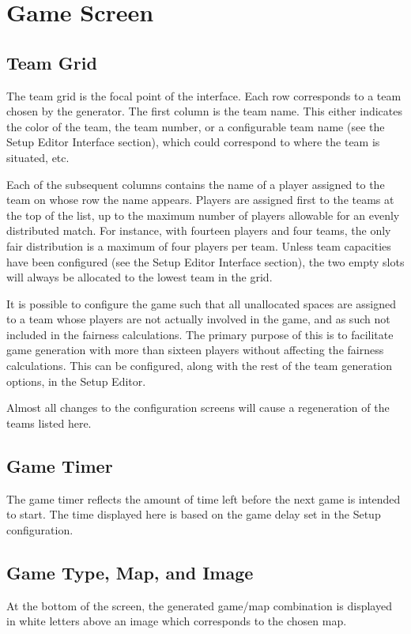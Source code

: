 \documentclass[10pt,a4paper]{report}
\begin{document}
\section{Game Screen}
\subsection{Team Grid}
The team grid is the focal point of the interface.  Each row corresponds to a team chosen by the generator.  The first column is the team name.  This either indicates the color of the team, the team number, or a configurable team name (see the Setup Editor Interface section), which could correspond to where the team is situated, etc.

Each of the subsequent columns contains the name of a player assigned to the team on whose row the name appears.  Players are assigned first to the teams at the top of the list, up to the maximum number of players allowable for an evenly distributed match.  For instance, with fourteen players and four teams, the only fair distribution is a maximum of four players per team.  Unless team capacities have been configured (see the Setup Editor Interface section), the two empty slots will always be allocated to the lowest team in the grid.

It is possible to configure the game such that all unallocated spaces are assigned to a team whose players are not actually involved in the game, and as such not included in the fairness calculations.  The primary purpose of this is to facilitate game generation with more than sixteen players without affecting the fairness calculations.  This can be configured, along with the rest of the team generation options, in the Setup Editor.

Almost all changes to the configuration screens will cause a regeneration of the teams listed here.

\subsection{Game Timer}
The game timer reflects the amount of time left before the next game is intended to start.  The time displayed here is based on the game delay set in the Setup configuration.

\subsection{Game Type, Map, and Image}
At the bottom of the screen, the generated game/map combination is displayed in white letters above an image which corresponds to the chosen map.
\end{document}
